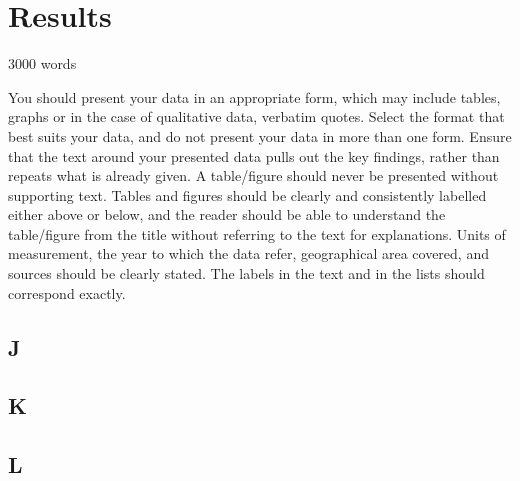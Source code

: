 \chapter{Results}\label{ch:results}

3000 words

You should present your data in an appropriate form, which may include tables, graphs or in the case of qualitative data, verbatim quotes. Select the format that best suits your data, and do not present your data in more than one form. Ensure that the text around your presented data pulls out the key findings, rather than repeats what is already given. A table/figure should never be presented without supporting text. Tables and figures should be clearly and consistently labelled either above or below, and the reader should be able to understand the table/figure from the title without referring to the text for explanations. Units of measurement, the year to which the data refer, geographical area covered, and sources should be clearly stated. The labels in the text and in the lists should correspond exactly.

\section{J}\label{sec:J}
\lipsum[1]

\section{K}\label{sec:K}
\lipsum[1]

\section{L}\label{sec:L}
\lipsum[1]